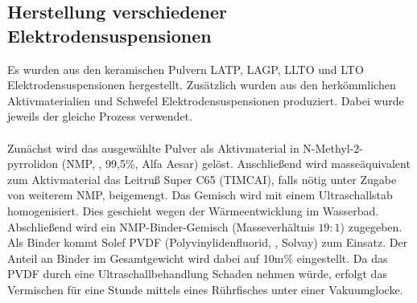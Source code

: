 \documentclass[a4paper, 11pt, headsepline,footsepline,twoside,abstract]{scrbook}
\begin{document}
\subsection{Herstellung verschiedener Elektrodensuspensionen}
Es wurden aus den keramischen Pulvern LATP, LAGP, LLTO und LTO  Elektrodensuspensionen hergestellt. Zusätzlich wurden aus den herkömmlichen Aktivmaterialien  und Schwefel Elektrodensuspensionen produziert. Dabei wurde jeweils der gleiche Prozess verwendet. 
\\\\
Zunächst wird das ausgewählte Pulver als Aktivmaterial in N-Methyl-2-pyrrolidon (NMP, , 99,5\%, Alfa Aesar) gelöst. Anschließend wird masseäquivalent zum Aktivmaterial das Leitruß Super C65 (TIMCAI), falls nötig unter Zugabe von weiterem NMP, beigemengt. Das Gemisch wird mit einem Ultraschallstab homogenisiert. Dies geschieht wegen der Wärmeentwicklung im Wasserbad. Abschließend wird ein NMP-Binder-Gemisch (Masseverhältnis $19:1$) zugegeben. Als Binder kommt Solef PVDF (Polyvinylidenfluorid, , Solvay) zum Einsatz. Der Anteil an Binder im Gesamtgewicht wird dabei auf 10m\% eingestellt. Da das PVDF durch eine Ultraschallbehandlung Schaden nehmen würde, erfolgt das Vermischen für eine Stunde mittels eines Rührfisches unter einer Vakuumglocke.
\end{document}
